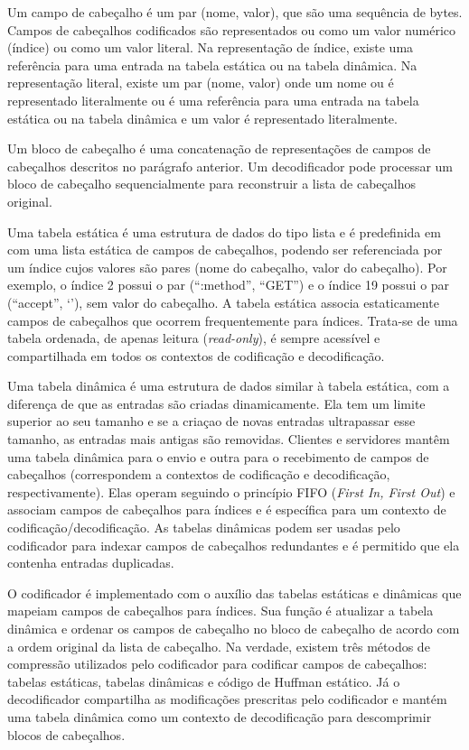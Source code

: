 Um campo de cabeçalho é um par (nome, valor), que são uma sequência de bytes. Campos de cabeçalhos codificados são representados ou como um valor numérico (índice) ou como um valor literal. Na representação de índice, existe uma referência para uma entrada na tabela estática ou na tabela dinâmica. Na representação literal, existe um par (nome, valor) onde um nome ou é representado literalmente ou é uma referência para uma entrada na tabela estática ou na tabela dinâmica e um valor é representado literalmente.

Um bloco de cabeçalho é uma concatenação de representações de campos de cabeçalhos descritos no parágrafo anterior. Um decodificador pode processar um bloco de cabeçalho sequencialmente para reconstruir a lista de cabeçalhos original.

Uma tabela estática é uma estrutura de dados do tipo lista e é predefinida em \cite{BelsheRFC7541} com uma lista estática de campos de cabeçalhos, podendo ser referenciada por um índice cujos valores são pares (nome do cabeçalho, valor do cabeçalho). Por exemplo, o índice 2 possui o par (``:method'', ``GET'') e o índice 19 possui o par (``accept'', `'), sem valor do cabeçalho. A tabela estática associa estaticamente campos de cabeçalhos que ocorrem frequentemente para índices. Trata-se de uma tabela ordenada, de apenas leitura ({\em read-only}), é sempre acessível e compartilhada em todos os contextos de codificação e decodificação.

Uma tabela dinâmica é uma estrutura de dados similar à tabela estática, com a diferença de que as entradas são criadas dinamicamente. Ela tem um limite superior ao seu tamanho e se a criaçao de novas entradas ultrapassar esse tamanho, as entradas mais antigas são removidas. Clientes e servidores mantêm uma tabela dinâmica para o envio e outra para o recebimento de campos de cabeçalhos (correspondem a contextos de codificação e decodificação, respectivamente). Elas operam seguindo o princípio FIFO ({\em First In, First Out}) e associam campos de cabeçalhos para índices e é específica para um contexto de codificação\slash decodificação. As tabelas dinâmicas podem ser usadas pelo codificador para indexar campos de cabeçalhos redundantes e é permitido que ela contenha entradas duplicadas.

O codificador é implementado com o auxílio das tabelas estáticas e dinâmicas que mapeiam campos de cabeçalhos para índices. Sua função é atualizar a tabela dinâmica e ordenar os campos de cabeçalho no bloco de cabeçalho de acordo com a ordem original da lista de cabeçalho. Na verdade, existem três métodos de compressão utilizados pelo codificador para codificar campos de cabeçalhos: tabelas estáticas, tabelas dinâmicas e código de Huffman estático. Já o decodificador compartilha as modificações prescritas pelo codificador e mantém uma tabela dinâmica como um contexto de decodificação para descomprimir blocos de cabeçalhos.

